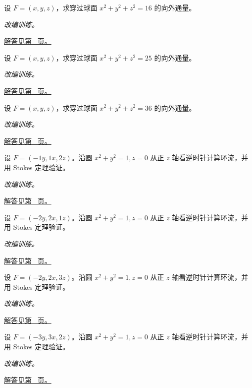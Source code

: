 \documentclass[UTF8,12pt,a4paper,fontset=fandol]{ctexart}
\begin{document}
\begin{example}[散度定理计算球面通量]\label{ex:c43q16}
设 $F=(x,y,z)$，求穿过球面 $x^2+y^2+z^2=16$ 的向外通量。
\par\textit{改编训练。}\par\hyperref[ans:c43q16]{解答见第~\pageref{ans:c43q16} 页。}
\end{example}
\begin{example}[散度定理计算球面通量]\label{ex:c43q17}
设 $F=(x,y,z)$，求穿过球面 $x^2+y^2+z^2=25$ 的向外通量。
\par\textit{改编训练。}\par\hyperref[ans:c43q17]{解答见第~\pageref{ans:c43q17} 页。}
\end{example}
\begin{example}[散度定理计算球面通量]\label{ex:c43q18}
设 $F=(x,y,z)$，求穿过球面 $x^2+y^2+z^2=36$ 的向外通量。
\par\textit{改编训练。}\par\hyperref[ans:c43q18]{解答见第~\pageref{ans:c43q18} 页。}
\end{example}
\begin{example}\label{ex:c43q19}
设 $F=(-1y,1x,2z)$。沿圆 $x^2+y^2=1,z=0$ 从正 $z$ 轴看逆时针计算环流，并用 Stokes 定理验证。
\par\textit{改编训练。}\par\hyperref[ans:c43q19]{解答见第~\pageref{ans:c43q19} 页。}
\end{example}
\begin{example}\label{ex:c43q20}
设 $F=(-2y,2x,1z)$。沿圆 $x^2+y^2=1,z=0$ 从正 $z$ 轴看逆时针计算环流，并用 Stokes 定理验证。
\par\textit{改编训练。}\par\hyperref[ans:c43q20]{解答见第~\pageref{ans:c43q20} 页。}
\end{example}
\begin{example}\label{ex:c43q21}
设 $F=(-2y,2x,3z)$。沿圆 $x^2+y^2=1,z=0$ 从正 $z$ 轴看逆时针计算环流，并用 Stokes 定理验证。
\par\textit{改编训练。}\par\hyperref[ans:c43q21]{解答见第~\pageref{ans:c43q21} 页。}
\end{example}
\begin{example}\label{ex:c43q22}
设 $F=(-3y,3x,2z)$。沿圆 $x^2+y^2=1,z=0$ 从正 $z$ 轴看逆时针计算环流，并用 Stokes 定理验证。
\par\textit{改编训练。}\par\hyperref[ans:c43q22]{解答见第~\pageref{ans:c43q22} 页。}
\end{example}
\end{document}
